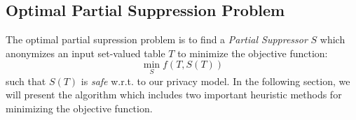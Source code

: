 \subsection{Optimal Partial Suppression Problem}
The optimal partial supression problem is to find a {\em Partial Suppressor} $S$
which anonymizes an input set-valued table $T$ to minimize
the objective function:
\[\min_S f(T, S(T))\]
such that $S(T)$ is {\em safe} w.r.t. to our privacy model.
In the following section, we will present the algorithm which 
includes two important heuristic 
methods for minimizing the objective function.


